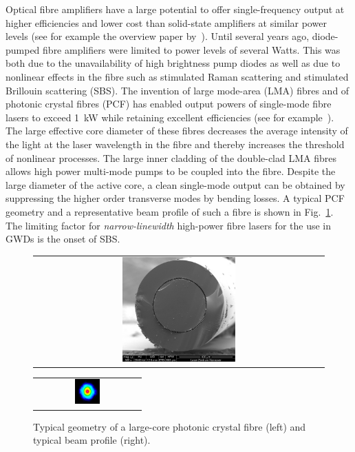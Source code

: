 Optical fibre amplifiers have a large potential to offer single-frequency output at higher efficiencies and lower cost than solid-state amplifiers at similar power levels (see for example the overview paper by~\citet{Limpert2007}). Until several years ago, diode-pumped fibre amplifiers were limited to power levels of several Watts. This was both due to the unavailability of high brightness pump diodes as well as due to nonlinear effects in the fibre such as stimulated Raman scattering and stimulated Brillouin scattering (SBS).
The invention of large mode-area (LMA) fibres and of photonic crystal fibres (PCF) has enabled output powers of single-mode fibre lasers to exceed 1~kW while retaining excellent efficiencies (see for example~\citet{Jeong2004}). The large effective core diameter of these fibres decreases the average intensity of the light at the laser wavelength in the fibre and thereby increases the threshold of nonlinear processes. The large inner cladding of the double-clad LMA fibres allows high power multi-mode pumps to be coupled into the fibre. Despite the large diameter of the active core, a clean single-mode output can be obtained by suppressing the higher order transverse modes by bending losses. A typical PCF geometry and a representative beam profile of such a fibre is shown in Fig.~\ref{fig:pcf_geometry}. The limiting factor for \emph{narrow-linewidth} high-power fibre lasers for the use in GWDs is the onset of SBS.

\begin{figure}[h]
\begin{center}
  \begin{tabular}[c]{c}
    \includegraphics[width=0.4\textwidth]{./Sec_Optics/sem_picture_pcf}
  \end{tabular}
  \hspace*{1cm}
  \begin{tabular}[c]{c}
    \includegraphics[width=0.25\textwidth]{./Sec_Optics/beamprofile_pcf}
  \end{tabular}
  \caption{Typical geometry of a large-core photonic crystal fibre (left) and typical beam profile (right).}
  \label{fig:pcf_geometry}
\end{center}
\end{figure}

